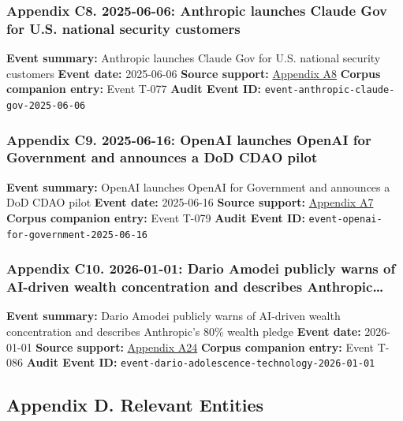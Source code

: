 \documentclass[
  american,
  11pt,
  letterpaper,
]{article}
\begin{document}
\subsubsection{Appendix C8. 2025-06-06: Anthropic launches Claude Gov
for U.S. national security
customers}\label{appendix-c8-2025-06-06-anthropic-launches-claude-gov-for-u-s-national-security-customers}

\textbf{Event summary:} Anthropic launches Claude Gov for U.S. national
security customers \textbf{Event date:} 2025-06-06 \textbf{Source
support:}
\hyperref[appendix-a8-claude-gov-models-for-u-s-national-security-customers]{Appendix
A8} \textbf{Corpus companion entry:} Event T-077 \textbf{Audit Event
ID:} \texttt{event-anthropic-claude-gov-2025-06-06}

\subsubsection{Appendix C9. 2025-06-16: OpenAI launches OpenAI for
Government and announces a DoD CDAO
pilot}\label{appendix-c9-2025-06-16-openai-launches-openai-for-government-and-announces-a-dod-cdao-pilot}

\textbf{Event summary:} OpenAI launches OpenAI for Government and
announces a DoD CDAO pilot \textbf{Event date:} 2025-06-16
\textbf{Source support:}
\hyperref[appendix-a7-introducing-openai-for-government]{Appendix A7}
\textbf{Corpus companion entry:} Event T-079 \textbf{Audit Event ID:}
\texttt{event-openai-for-government-2025-06-16}

\subsubsection{Appendix C10. 2026-01-01: Dario Amodei publicly warns of
AI-driven wealth concentration and describes
Anthropic\ldots{}}\label{appendix-c10-2026-01-01-dario-amodei-publicly-warns-of-ai-driven-wealth-concentration-and-describes-anthropic-s-80-wealth-pledge}

\textbf{Event summary:} Dario Amodei publicly warns of AI-driven wealth
concentration and describes Anthropic's 80\% wealth pledge \textbf{Event
date:} 2026-01-01 \textbf{Source support:}
\hyperref[appendix-a24-the-adolescence-of-technology]{Appendix A24}
\textbf{Corpus companion entry:} Event T-086 \textbf{Audit Event ID:}
\texttt{event-dario-adolescence-technology-2026-01-01}

\subsection{Appendix D. Relevant
Entities}\label{appendix-d.-relevant-entities}
\end{document}
